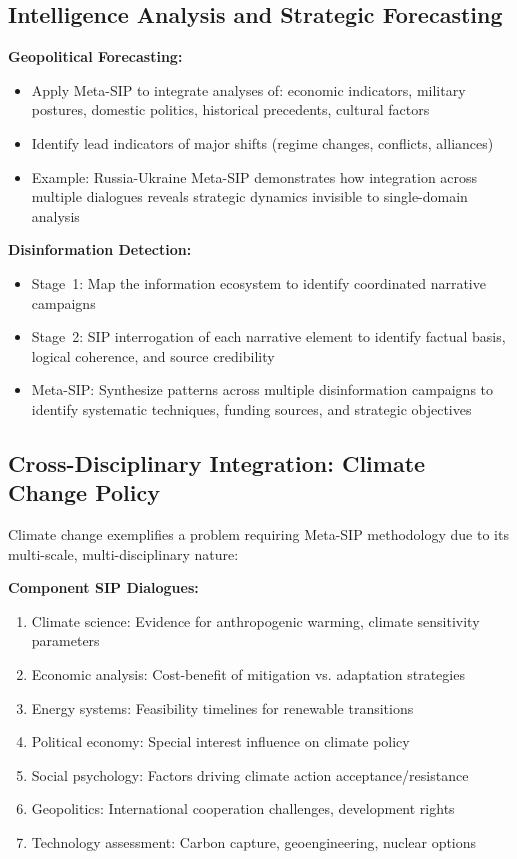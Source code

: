 \documentclass[11pt,a4paper]{article}
\begin{document}
\begin{small}
\subsection{Intelligence Analysis and Strategic Forecasting}

\textbf{Geopolitical Forecasting:}
\begin{itemize}[nosep]
    \item Apply Meta-SIP to integrate analyses of: economic indicators, military postures, domestic politics, historical precedents, cultural factors
    \item Identify lead indicators of major shifts (regime changes, conflicts, alliances)
    \item Example: Russia-Ukraine Meta-SIP demonstrates how integration across multiple dialogues reveals strategic dynamics invisible to single-domain analysis
\end{itemize}

\textbf{Disinformation Detection:}
\begin{itemize}[nosep]
    \item Stage~1: Map the information ecosystem to identify coordinated narrative campaigns
    \item Stage~2: SIP interrogation of each narrative element to identify factual basis, logical coherence, and source credibility
    \item Meta-SIP: Synthesize patterns across multiple disinformation campaigns to identify systematic techniques, funding sources, and strategic objectives
\end{itemize}

\subsection{Cross-Disciplinary Integration: Climate Change Policy}

Climate change exemplifies a problem requiring Meta-SIP methodology due to its multi-scale, multi-disciplinary nature:

\textbf{Component SIP Dialogues:}
\begin{enumerate}[nosep]
    \item Climate science: Evidence for anthropogenic warming, climate sensitivity parameters
    \item Economic analysis: Cost-benefit of mitigation vs. adaptation strategies
    \item Energy systems: Feasibility timelines for renewable transitions
    \item Political economy: Special interest influence on climate policy
    \item Social psychology: Factors driving climate action acceptance/resistance
    \item Geopolitics: International cooperation challenges, development rights
    \item Technology assessment: Carbon capture, geoengineering, nuclear options
\end{enumerate}


\end{small}
\end{document}
